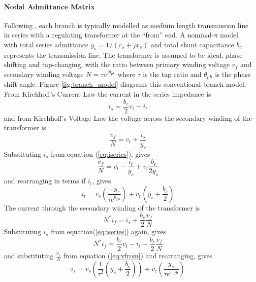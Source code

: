 \paragraph{Nodal Admittance Matrix}
Following \cite[p.11]{pserc:mp_manual}, each branch is typically modelled as
medium length transmission line in series with a regulating transformer at
the ``from'' end.  A nominal-$\pi$ model with total series admittance $y_s = 1/(r_s+jx_s)$ and total shunt capacitance $b_c$
represents the transmission line.  The transformer is assumed to be ideal,
phase-shifting and tap-changing, with the ratio between primary winding
voltage $v_{f}$ and secondary winding voltage $N = \tau e^{j\theta_{ph}}$
where $\tau$ is the tap ratio and $\theta_{ph}$ is the phase shift angle.
Figure \ref{fig:branch_model} diagrams this conventional branch model.  From
Kirchhoff's Current Law the current in the series impedance is
\begin{equation}
\label{eq:iseries}
i_s = \frac{b_c}{2}v_t - i_t
\end{equation}
and from Kirchhoff's Voltage Law the voltage across the secondary winding of
the transformer is
\begin{equation}
\frac{v_{f}}{N} = v_t + \frac{i_s}{y_s}
\end{equation}
Substituting $i_s$ from equation (\ref{eq:iseries}), gives
\begin{equation}
\label{eq:vfrom}
\frac{v_{f}}{N} = v_t - \frac{i_t}{y_s} + v_t\frac{b_c}{2y_s}
\end{equation}
and rearranging in terms if $i_t$, gives
\begin{equation}
\label{eq:ito}
i_t = v_s \left( \frac{-y_s}{\tau e^{\theta_{ph}}} \right) +
v_r \left( y_s + \frac{b_c}{2} \right)
\end{equation}
The current through the secondary winding of the transformer is
\begin{equation}
N^*i_f = i_s + \frac{b_c}{2}\frac{v_{f}}{N}
\end{equation}
Substituting $i_s$ from equation(\ref{eq:iseries}) again, gives
\begin{equation}
N^*i_f = \frac{b_c}{2}v_t - i_t + \frac{b_c}{2}\frac{v_{f}}{N}
\end{equation}
and substituting $\frac{v_{f}}{N}$ from equation (\ref{eq:vfrom}) and
rearranging, gives
\begin{equation}
\label{eq:ifrom}
i_s = v_s \left( \frac{1}{\tau^2} \left(y_s + \frac{b_c}{2}\right) \right) +
v_r \left(\frac{y_s}{\tau e^{-j\theta}}\right)
\end{equation}

